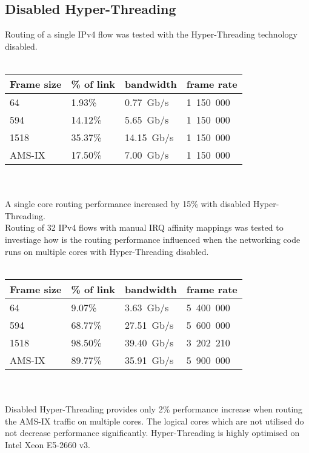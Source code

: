 
\subsection{Disabled Hyper-Threading}
Routing of a single IPv4 flow was tested with the Hyper-Threading technology disabled.
\\
\\
\begin{tabular}{ | l | l | l | l | }
\hline
Frame size & \% of link & bandwidth & frame rate \\
\hline
64     &  1.93\% &  0.77~Gb/s & 1~150~000 \\
594    & 14.12\% &  5.65~Gb/s & 1~150~000 \\
1518   & 35.37\% & 14.15~Gb/s & 1~150~000 \\
AMS-IX & 17.50\% &  7.00~Gb/s & 1~150~000 \\
\hline
\end{tabular}
\\
\\
A single core routing performance increased by 15\% with disabled Hyper-Threading.
\\
Routing of 32 IPv4 flows with manual IRQ affinity mappings was tested to investiage
how is the routing performance influenced when the networking code runs
on multiple cores with Hyper-Threading disabled.
\\
\\
\begin{tabular}{ | l | l | l | l | }
\hline
Frame size & \% of link & bandwidth & frame rate \\
\hline
64     &  9.07\% &  3.63~Gb/s & 5~400~000 \\
594    & 68.77\% & 27.51~Gb/s & 5~600~000 \\
1518   & 98.50\% & 39.40~Gb/s & 3~202~210 \\
AMS-IX & 89.77\% & 35.91~Gb/s & 5~900~000 \\
\hline
\end{tabular}
\\
\\
Disabled Hyper-Threading provides only 2\% performance increase when routing the AMS-IX traffic on multiple cores.
The logical cores which are not utilised do not decrease performance significantly.
Hyper-Threading is highly optimised on Intel Xeon E5-2660 v3.
